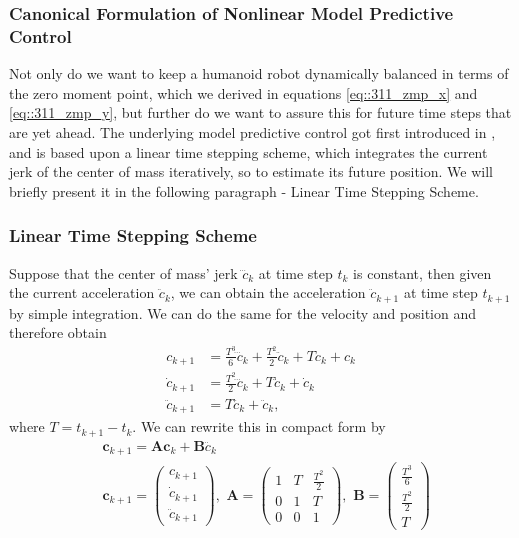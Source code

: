 \subsubsection{Canonical Formulation of Nonlinear Model Predictive Control}
Not only do we want to keep a humanoid robot dynamically balanced in terms of the zero moment point, which we derived in equations \ref{eq::311_zmp_x} and \ref{eq::311_zmp_y}, but further do we want to assure this for future time steps that are yet ahead. The underlying model predictive control got first introduced in \cite{kajita2003biped}, and is based upon a linear time stepping scheme, which integrates the current jerk of the center of mass iteratively, so to estimate its future position. We will briefly present it in the following paragraph - Linear Time Stepping Scheme.
\subsubsection{Linear Time Stepping Scheme}
Suppose that the center of mass' jerk $\dddot{c}_k$ at time step $t_k$ is constant, then given the current acceleration $\ddot{c}_k$, we can obtain the acceleration $\ddot{c}_{k+1}$ at time step $t_{k+1}$ by simple integration. We can do the same for the velocity and position and therefore obtain
\begin{align}
	c_{k+1} &= \frac{T^3}{6}\dddot{c}_k+\frac{T^2}{2}\ddot{c}_k+T\dot{c}_k+c_k\\
	\dot{c}_{k+1} &= \frac{T^2}{2}\dddot{c}_k+T\ddot{c}_k+\dot{c}_k\\
	\ddot{c}_{k+1} &= T\dddot{c}_{k} + \ddot{c}_k,
\end{align}
where $T = t_{k+1}-t_k$. We can rewrite this in compact form by
\begin{align}
	&\bm{c}_{k+1} = \bm{A}\bm{c}_k + \bm{B}\dddot{c}_k \\
	&\bm{c}_{k+1} = \begin{pmatrix}
	c_{k+1} \\
	\dot{c}_{k+1} \\
	\ddot{c}_{k+1}
	\end{pmatrix},\,\,
	\bm{A} = \begin{pmatrix}
	1 & T & \frac{T^2}{2} \\
	0 & 1 & T \\
	0 & 0 & 1
	\end{pmatrix},\,\,
	\bm{B} = \begin{pmatrix}
	\frac{T^3}{6} \\
	\frac{T^2}{2} \\
	T
	\end{pmatrix}
	\label{eq::321_ltss}
\end{align}
